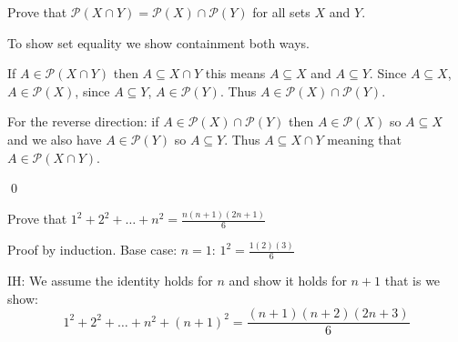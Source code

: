\documentclass[addpoints,12pt]{exam}
\begin{document}
\begin{questions}

  \question[20] Prove that $\mathcal{P}(X\cap Y) = \mathcal{P}(X)\cap
  \mathcal{P}(Y)$ for all sets $X$ and $Y$.
  \vspace*{10cm}
  \begin{solution}
    To show set equality we show containment both ways.

    If $A \in \mathcal{P}(X\cap Y)$ then $A\subseteq X\cap Y$ this means
    $A\subseteq X$ and $A\subseteq Y$. Since $A\subseteq X$, $A\in
    \mathcal{P}(X)$, since $A\subseteq Y$, $A\in \mathcal{P}(Y)$. Thus $A\in
    \mathcal{P}(X)\cap \mathcal{P}(Y)$.

    For the reverse direction: if $A\in \mathcal{P}(X)\cap \mathcal{P}(Y)$ then
    $A\in \mathcal{P}(X)$ so $A\subseteq X$ and we also have $A\in
    \mathcal{P}(Y)$ so $A\subseteq Y$. Thus $A\subseteq X\cap Y$ meaning that
    $A\in \mathcal{P}(X\cap Y)$.
    
    \qed
  \end{solution}

  \question[25] Prove that $1^2 + 2^2 + \dots+ n^2 = \frac{n(n+1)(2n+1)}{6}$
  \vspace*{10cm}
  \begin{solution}
    Proof by induction. Base case: $n=1$: $1^2 = \frac{1(2)(3)}{6}$

    IH: We assume the identity holds for $n$ and show it holds for $n+1$ that is
    we show:
    \[
      1^2 + 2^2 + \dots + n^2 + (n+1)^2 = \frac{(n+1)(n+2)(2n+3)}{6}
    \]


\end{solution}
\end{questions}
\end{document}
